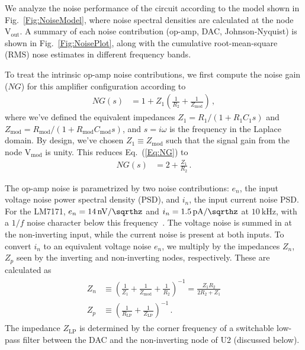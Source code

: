 \documentclass[aip,rsi,reprint]{revtex4-1} %
\begin{document}
We analyze the noise performance of the circuit according to the model shown in Fig.~\ref{Fig:NoiseModel}, where noise spectral densities are calculated at the node $\text{V}_\text{out}$.
A summary of each noise contribution (op-amp, DAC, Johnson-Nyquist) is shown in Fig.~\ref{Fig:NoisePlot}, along with the cumulative root-mean-square (RMS) nose estimates in different frequency bands.

To treat the intrinsic op-amp noise contributions, we first compute the noise gain ($NG$) for this amplifier configuration according to
\begin{align}
\label{Eq:NG}
NG(s) &= 1 + Z_1\left(\frac{1}{R_2} + \frac{1}{Z_\text{mod}}\right)\,,
\end{align}
where we've defined the equivalent impedances $Z_1 = R_1/(1+R_1 C_1 s)$ and $Z_{\text{mod}} = R_{\text{mod}}/(1+R_{\text{mod}} C_{\text{mod}} s)$, and $s = i\omega$ is the frequency in the Laplace domain.
By design, we've chosen $Z_1 \equiv Z_{\text{mod}}$ such that the signal gain from the node $\text{V}_{\text{mod}}$ is unity.
This reduces Eq.~(\ref{Eq:NG}) to
\begin{align}
\label{Eq:RedNG}
NG(s) &= 2 + \frac{Z_1}{R_2}\,.
\end{align}

The op-amp noise is parametrized by two noise contributions: $e_n$, the input voltage noise power spectral density (PSD), and $i_n$, the input current noise PSD.
For the LM7171, $e_n = \SI[per-mode=symbol]{14}{\nano\volt\per\sqrthz}$ and $i_n = \SI[per-mode=symbol]{1.5}{\pico\ampere\per\sqrthz}$ at $\SI{10}{\kilo\hertz}$, with a $1/f$ noise character below this frequency~\cite{LM7171Datasheet}.
The voltage noise is summed in at the non-inverting input, while the current noise is present at both inputs.
To convert $i_n$ to an equivalent voltage noise $e_n$, we multiply by the impedances $Z_n$, $Z_p$ seen by the inverting and non-inverting nodes, respectively.
These are calculated as
\begin{align}
\begin{split}
\label{Eq:ZnZp}
Z_n &\equiv \left(\frac{1}{Z_1} + \frac{1}{Z_\text{mod}} +  \frac{1}{R_2}\right)^{-1}   = \frac{Z_1 R_2}{2R_2 + Z_1} \\
Z_p &\equiv \left(\frac{1}{R_\text{LP}} + \frac{1}{Z_\text{LP}}\right)^{-1}\,.
\end{split}
\end{align}
The impedance $Z_\text{LP}$ is determined by the corner frequency of a switchable low-pass filter between the DAC and the non-inverting node of U2 (discussed below).
\end{document}
